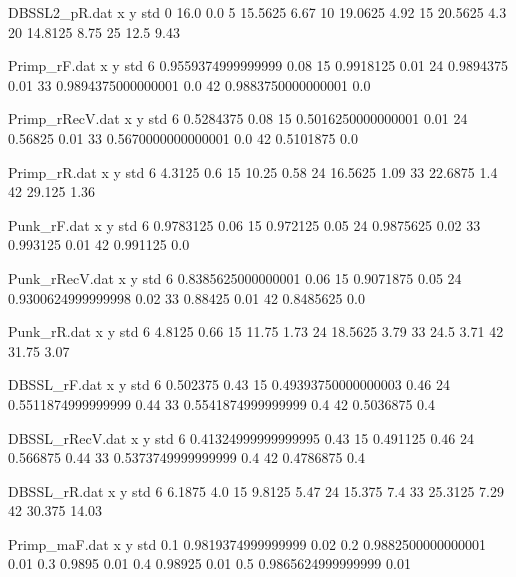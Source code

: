 \begin{filecontents}{DBSSL2_pR.dat}
x y std
0 16.0 0.0
5 15.5625 6.67
10 19.0625 4.92
15 20.5625 4.3
20 14.8125 8.75
25 12.5 9.43
\end{filecontents}
\begin{filecontents}{Primp_rF.dat}
x y std
6 0.9559374999999999 0.08
15 0.9918125 0.01
24 0.9894375 0.01
33 0.9894375000000001 0.0
42 0.9883750000000001 0.0
\end{filecontents}
\begin{filecontents}{Primp_rRecV.dat}
x y std
6 0.5284375 0.08
15 0.5016250000000001 0.01
24 0.56825 0.01
33 0.5670000000000001 0.0
42 0.5101875 0.0
\end{filecontents}
\begin{filecontents}{Primp_rR.dat}
x y std
6 4.3125 0.6
15 10.25 0.58
24 16.5625 1.09
33 22.6875 1.4
42 29.125 1.36
\end{filecontents}
\begin{filecontents}{Punk_rF.dat}
x y std
6 0.9783125 0.06
15 0.972125 0.05
24 0.9875625 0.02
33 0.993125 0.01
42 0.991125 0.0
\end{filecontents}
\begin{filecontents}{Punk_rRecV.dat}
x y std
6 0.8385625000000001 0.06
15 0.9071875 0.05
24 0.9300624999999998 0.02
33 0.88425 0.01
42 0.8485625 0.0
\end{filecontents}
\begin{filecontents}{Punk_rR.dat}
x y std
6 4.8125 0.66
15 11.75 1.73
24 18.5625 3.79
33 24.5 3.71
42 31.75 3.07
\end{filecontents}
\begin{filecontents}{DBSSL_rF.dat}
x y std
6 0.502375 0.43
15 0.49393750000000003 0.46
24 0.5511874999999999 0.44
33 0.5541874999999999 0.4
42 0.5036875 0.4
\end{filecontents}
\begin{filecontents}{DBSSL_rRecV.dat}
x y std
6 0.41324999999999995 0.43
15 0.491125 0.46
24 0.566875 0.44
33 0.5373749999999999 0.4
42 0.4786875 0.4
\end{filecontents}
\begin{filecontents}{DBSSL_rR.dat}
x y std
6 6.1875 4.0
15 9.8125 5.47
24 15.375 7.4
33 25.3125 7.29
42 30.375 14.03
\end{filecontents}
\begin{filecontents}{Primp_maF.dat}
x y std
0.1 0.9819374999999999 0.02
0.2 0.9882500000000001 0.01
0.3 0.9895 0.01
0.4 0.98925 0.01
0.5 0.9865624999999999 0.01
\end{filecontents}
